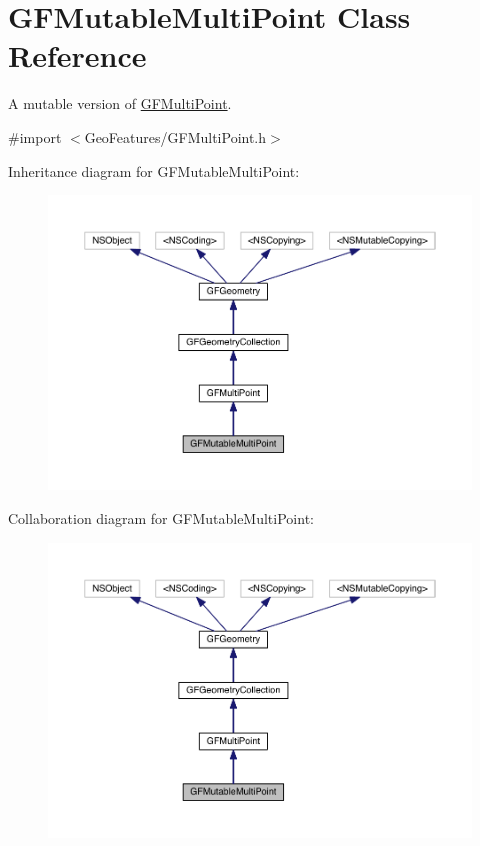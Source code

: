 \hypertarget{interface_g_f_mutable_multi_point}{}\section{G\+F\+Mutable\+Multi\+Point Class Reference}
\label{interface_g_f_mutable_multi_point}


A mutable version of \hyperlink{interface_g_f_multi_point}{G\+F\+Multi\+Point}.  




{\ttfamily \#import $<$Geo\+Features/\+G\+F\+Multi\+Point.\+h$>$}



Inheritance diagram for G\+F\+Mutable\+Multi\+Point\+:\nopagebreak
\begin{figure}[H]
\begin{center}
\leavevmode
\includegraphics[width=350pt]{interface_g_f_mutable_multi_point__inherit__graph}
\end{center}
\end{figure}


Collaboration diagram for G\+F\+Mutable\+Multi\+Point\+:\nopagebreak
\begin{figure}[H]
\begin{center}
\leavevmode
\includegraphics[width=350pt]{interface_g_f_mutable_multi_point__coll__graph}
\end{center}
\end{figure}
